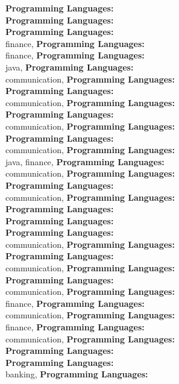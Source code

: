 \textbf{Programming Languages:} \\
\textbf{Programming Languages:} \\
\textbf{Programming Languages:} \\
finance, \textbf{Programming Languages:} \\
finance, \textbf{Programming Languages:} \\
java, \textbf{Programming Languages:} \\
communication, \textbf{Programming Languages:} \\
\textbf{Programming Languages:} \\
communication, \textbf{Programming Languages:} \\
\textbf{Programming Languages:} \\
communication, \textbf{Programming Languages:} \\
\textbf{Programming Languages:} \\
communication, \textbf{Programming Languages:} \\
java, finance, \textbf{Programming Languages:} \\
communication, \textbf{Programming Languages:} \\
\textbf{Programming Languages:} \\
communication, \textbf{Programming Languages:} \\
\textbf{Programming Languages:} \\
\textbf{Programming Languages:} \\
\textbf{Programming Languages:} \\
communication, \textbf{Programming Languages:} \\
\textbf{Programming Languages:} \\
communication, \textbf{Programming Languages:} \\
\textbf{Programming Languages:} \\
communication, \textbf{Programming Languages:} \\
finance, \textbf{Programming Languages:} \\
communication, \textbf{Programming Languages:} \\
finance, \textbf{Programming Languages:} \\
communication, \textbf{Programming Languages:} \\
\textbf{Programming Languages:} \\
\textbf{Programming Languages:} \\
banking, \textbf{Programming Languages:} \\
